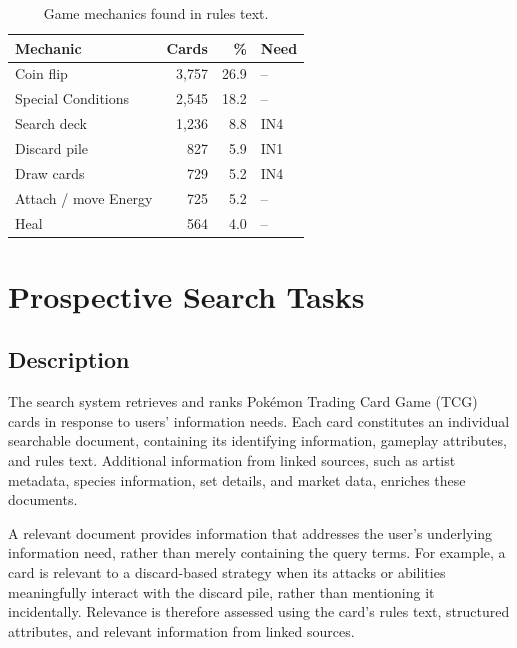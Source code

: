 \documentclass[sigconf]{acmart}
\begin{document}
  \begin{table}[ht]
      \centering
      \caption{Game mechanics found in rules text.}
      \label{tab:mechanics}
      \small
      \setlength{\tabcolsep}{4pt}
      \begin{tabular}{lrrl}
          \hline
          \textbf{Mechanic} & \textbf{Cards} & \textbf{\%} & \textbf{Need} \\
          \hline
          Coin flip & 3{,}757 & 26.9 & -- \\
          Special Conditions & 2{,}545 & 18.2 & -- \\
          Search deck & 1{,}236 & 8.8 & IN4 \\
          Discard pile & 827 & 5.9 & IN1 \\
          Draw cards & 729 & 5.2 & IN4 \\
          Attach / move Energy & 725 & 5.2 & -- \\
          Heal & 564 & 4.0 & -- \\
          \hline
      \end{tabular}
  \end{table}


  \section{Prospective Search Tasks}

  \subsection{Description}

  The search system retrieves and ranks Pok\'emon Trading Card
  Game (TCG) cards in response to users' information needs.
  Each card constitutes an individual searchable document,
  containing its identifying information, gameplay attributes,
  and rules text. Additional information from linked sources,
  such as artist metadata, species information, set details,
  and market data, enriches these documents.

  A relevant document provides information that addresses
  the user's underlying information need, rather than merely
  containing the query terms. For example, a card is relevant
  to a discard-based strategy when its attacks or abilities
  meaningfully interact with the discard pile, rather than
  mentioning it incidentally. Relevance is therefore assessed
  using the card's rules text, structured attributes, and
  relevant information from linked sources.
\end{document}
